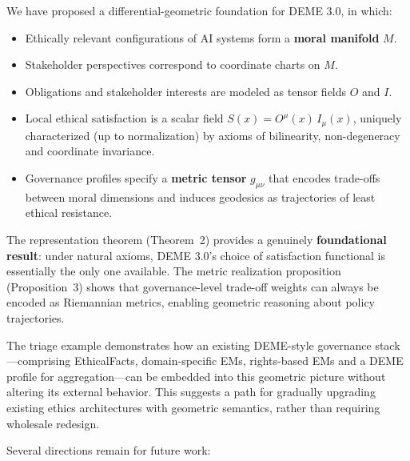 \documentclass[12pt]{article}
\theoremstyle{remark}
\begin{document}
We have proposed a differential-geometric foundation for DEME 3.0, in which:

\begin{itemize}
    \item Ethically relevant configurations of AI systems form a \textbf{moral manifold} $M$.
    \item Stakeholder perspectives correspond to coordinate charts on $M$.
    \item Obligations and stakeholder interests are modeled as tensor fields $O$ and $I$.
    \item Local ethical satisfaction is a scalar field $S(x) = O^\mu(x)\, I_\mu(x)$, uniquely characterized (up to normalization) by axioms of bilinearity, non-degeneracy and coordinate invariance.
    \item Governance profiles specify a \textbf{metric tensor} $g_{\mu\nu}$ that encodes trade-offs between moral dimensions and induces geodesics as trajectories of least ethical resistance.
\end{itemize}

The representation theorem (Theorem~2) provides a genuinely \textbf{foundational result}: under natural axioms, DEME 3.0's choice of satisfaction functional is essentially the only one available. The metric realization proposition (Proposition~3) shows that governance-level trade-off weights can always be encoded as Riemannian metrics, enabling geometric reasoning about policy trajectories.

The triage example demonstrates how an existing DEME-style governance stack---comprising EthicalFacts, domain-specific EMs, rights-based EMs and a DEME profile for aggregation---can be embedded into this geometric picture without altering its external behavior. This suggests a path for gradually upgrading existing ethics architectures with geometric semantics, rather than requiring wholesale redesign.

Several directions remain for future work:
\end{document}
